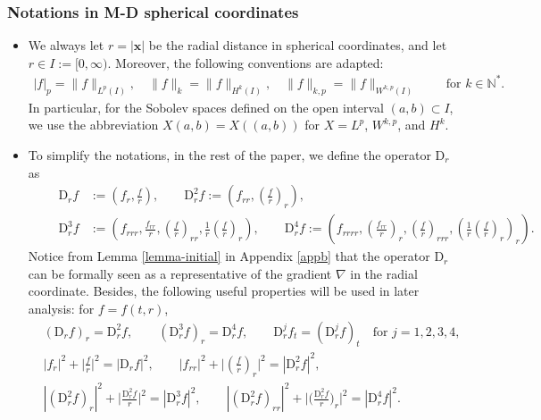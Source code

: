 \documentclass[11pt,reqno]{amsart}
\numberwithin{rk}{section}
\numberwithin{prop}{section}
\numberwithin{mydef}{section}
\numberwithin{lem}{section}
\numberwithin{equation}{section}
\numberwithin{thm}{section}
\begin{document}
\subsubsection{Notations in M-D spherical  coordinates}\label{Nor}
\begin{itemize}
\item We always let $r=|\boldsymbol{x}|$ be the radial distance in spherical coordinates, and let $r\in I:=[0,\infty)$. Moreover,  the following conventions are adapted:
\begin{align*}
|f|_p=\|f\|_{L^p(I)},\quad   \|f\|_k=\|f\|_{H^k(I)},\quad  \|f\|_{k,p}=\|f\|_{W^{k,p}(I)}
\qquad \,\,\text{for $k\in \mathbb{N}^*$}.
\end{align*}
In particular, for the Sobolev spaces defined on the open interval $(a,b)\subset I$, we use the abbreviation $X(a,b)=X((a,b))$ for $X=L^p$, $W^{k,p}$, and $H^k$.
\item To simplify the notations, in the rest of the paper, we define the operator $\mathrm{D}_r$ as 
\begin{equation*}
\qquad \begin{aligned}
\mathrm{D}_rf&:=(f_r,\frac{f}{r}),\qquad \mathrm{D}_r^2f:=(f_{rr},(\frac{f}{r})_r),\\
\mathrm{D}_r^3f&:=(f_{rrr},\frac{f_{rr}}{r},(\frac{f}{r})_{rr},\frac{1}{r}(\frac{f}{r})_r),\qquad
\mathrm{D}_r^4f :=(f_{rrrr},(\frac{f_{rr}}{r})_r,(\frac{f}{r})_{rrr},(\frac{1}{r}(\frac{f}{r})_r)_r).
\end{aligned}
\end{equation*}
Notice from Lemma \ref{lemma-initial}  in Appendix \ref{appb} that the operator $\mathrm{D}_r$ can be formally seen as a representative of the gradient $\nabla$ in the radial coordinate. Besides, the following useful properties will be used in later analysis: for $f=f(t,r)$,
\begin{equation*}
\begin{aligned}
&(\mathrm{D}_r f)_r=\mathrm{D}_r^2 f,\qquad (\mathrm{D}_r^3 f)_r=\mathrm{D}_r^4 f,\qquad \mathrm{D}_r^j f_t=(\mathrm{D}_r^j f)_t \quad \text{for $j=1,2,3,4$},\\
&|f_r|^2+\Big|\frac{f}{r}\Big|^2=|\mathrm{D}_r f|^2,\qquad |f_{rr}|^2+\Big|(\frac{f}{r})_r\Big|^2=|\mathrm{D}_r^2 f|^2,\\
&|(\mathrm{D}_r^2 f)_r|^2+\Big|\frac{\mathrm{D}_r^2 f}{r}\Big|^2=|\mathrm{D}_r^3 f|^2,\qquad |(\mathrm{D}_r^2 f)_{rr}|^2+\Big|\big(\frac{\mathrm{D}_r^2 f}{r}\big)_r\Big|^2=|\mathrm{D}_r^4 f|^2.
\end{aligned}
\end{equation*} 
\end{itemize}
\end{document}

